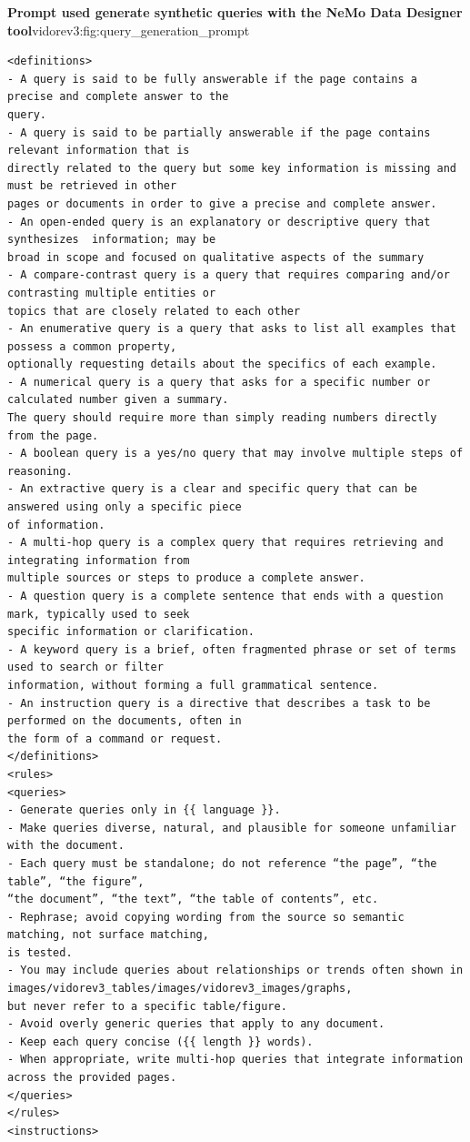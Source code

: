 \begin{promptfigure}{\textbf{Prompt used generate synthetic queries with the NeMo Data Designer tool}}{vidorev3:fig:query_generation_prompt}
\begin{Verbatim}[breaklines=true,breakanywhere=true,fontsize=\tiny]
<definitions>
- A query is said to be fully answerable if the page contains a precise and complete answer to the 
query.
- A query is said to be partially answerable if the page contains relevant information that is 
directly related to the query but some key information is missing and must be retrieved in other 
pages or documents in order to give a precise and complete answer.
- An open-ended query is an explanatory or descriptive query that synthesizes  information; may be 
broad in scope and focused on qualitative aspects of the summary
- A compare-contrast query is a query that requires comparing and/or contrasting multiple entities or 
topics that are closely related to each other
- An enumerative query is a query that asks to list all examples that possess a common property, 
optionally requesting details about the specifics of each example.
- A numerical query is a query that asks for a specific number or calculated number given a summary. 
The query should require more than simply reading numbers directly from the page.
- A boolean query is a yes/no query that may involve multiple steps of reasoning.
- An extractive query is a clear and specific query that can be answered using only a specific piece 
of information.
- A multi-hop query is a complex query that requires retrieving and integrating information from 
multiple sources or steps to produce a complete answer.
- A question query is a complete sentence that ends with a question mark, typically used to seek 
specific information or clarification.
- A keyword query is a brief, often fragmented phrase or set of terms used to search or filter 
information, without forming a full grammatical sentence.
- An instruction query is a directive that describes a task to be performed on the documents, often in 
the form of a command or request.
</definitions>
<rules>
<queries>
- Generate queries only in {{ language }}.
- Make queries diverse, natural, and plausible for someone unfamiliar with the document.
- Each query must be standalone; do not reference “the page”, “the table”, “the figure”, 
“the document”, “the text”, “the table of contents”, etc.
- Rephrase; avoid copying wording from the source so semantic matching, not surface matching, 
is tested.
- You may include queries about relationships or trends often shown in images/vidorev3_tables/images/vidorev3_images/graphs, 
but never refer to a specific table/figure.
- Avoid overly generic queries that apply to any document.
- Keep each query concise ({{ length }} words).
- When appropriate, write multi-hop queries that integrate information across the provided pages.
</queries>
</rules>
<instructions>


\end{Verbatim}
\end{promptfigure}

